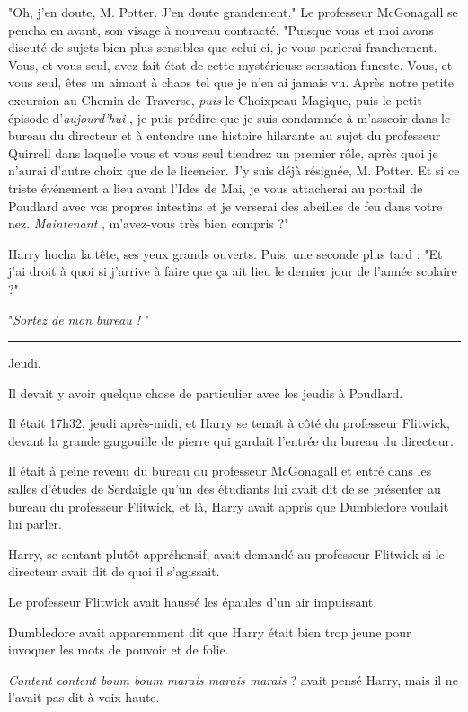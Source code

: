 "Oh, j'en doute, M. Potter. J'en doute grandement." Le professeur McGonagall se pencha en avant, son visage à nouveau contracté. "Puisque vous et moi avons discuté de sujets bien plus sensibles que celui-ci, je vous parlerai franchement. Vous, et vous seul, avez fait état de cette mystérieuse sensation funeste. Vous, et vous seul, êtes un aimant à chaos tel que je n'en ai jamais vu. Après notre petite excursion au Chemin de Traverse, \emph{puis}  le Choixpeau Magique, puis le petit épisode d'\emph{aujourd'hui} , je puis prédire que je suis condamnée à m'asseoir dans le bureau du directeur et à entendre une histoire hilarante au sujet du professeur Quirrell dans laquelle vous et vous seul tiendrez un premier rôle, après quoi je n'aurai d'autre choix que de le licencier. J'y suis déjà résignée, M. Potter. Et si ce triste événement a lieu avant l'Ides de Mai, je vous attacherai au portail de Poudlard avec vos propres intestins et je verserai des abeilles de feu dans votre nez. \emph{Maintenant} , m'avez-vous très bien compris ?"

Harry hocha la tête, ses yeux grands ouverts. Puis, une seconde plus tard : "Et j'ai droit à quoi si j'arrive à faire que ça ait lieu le dernier jour de l'année scolaire ?"

"\emph{Sortez de mon bureau !} "
\par\noindent\rule{\textwidth}{0.4pt}
Jeudi.

Il devait y avoir quelque chose de particulier avec les jeudis à Poudlard.

Il était 17h32, jeudi après-midi, et Harry se tenait à côté du professeur Flitwick, devant la grande gargouille de pierre qui gardait l'entrée du bureau du directeur.

Il était à peine revenu du bureau du professeur McGonagall et entré dans les salles d'études de Serdaigle qu'un des étudiants lui avait dit de se présenter au bureau du professeur Flitwick, et là, Harry avait appris que Dumbledore voulait lui parler.

Harry, se sentant plutôt appréhensif, avait demandé au professeur Flitwick si le directeur avait dit de quoi il s'agissait.

Le professeur Flitwick avait haussé les épaules d'un air impuissant.

Dumbledore avait apparemment dit que Harry était bien trop jeune pour invoquer les mots de pouvoir et de folie.

\emph{Content content boum boum marais marais marais}  ? avait pensé Harry, mais il ne l'avait pas dit à voix haute.

